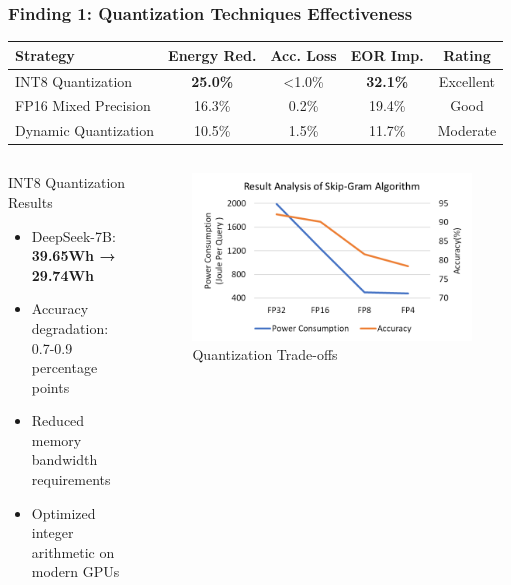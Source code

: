 \documentclass[aspectratio=169,xcolor=dvipsnames]{beamer}
\begin{document}
\begin{frame}
\frametitle{Finding 1: Quantization Techniques Effectiveness}

\begin{table}[h]
\centering
\begin{tabular}{@{}lcccc@{}}
\toprule
\textbf{Strategy} & \textbf{Energy Red.} & \textbf{Acc. Loss} & \textbf{EOR Imp.} & \textbf{Rating} \\
\midrule
INT8 Quantization & \textbf{25.0\%} & <1.0\% & \textbf{32.1\%} & Excellent \\
FP16 Mixed Precision & 16.3\% & 0.2\% & 19.4\% & Good \\
Dynamic Quantization & 10.5\% & 1.5\% & 11.7\% & Moderate \\
\bottomrule
\end{tabular}
\end{table}

\begin{columns}[c]
\begin{exampleblock}{INT8 Quantization Results}
\begin{itemize}
\item DeepSeek-7B: \textbf{39.65Wh → 29.74Wh}
\item Accuracy degradation: 0.7-0.9 percentage points
\item Reduced memory bandwidth requirements
\item Optimized integer arithmetic on modern GPUs
\end{itemize}
\end{exampleblock}

\begin{figure}
\centering
\includegraphics[width=\textwidth]{img/Result_Analysis_Algorithm.png}
\caption{Quantization Trade-offs}
\end{figure}

\end{columns}
\end{frame}
\end{document}
